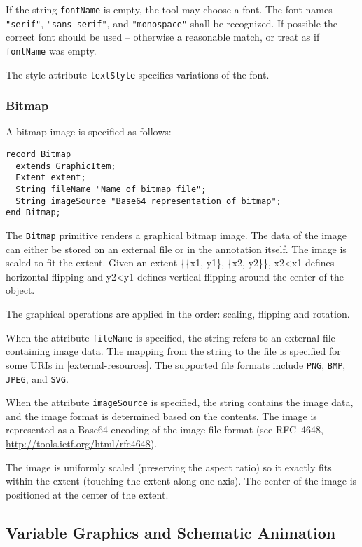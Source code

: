 If the string \lstinline!fontName! is empty, the tool may choose a font.  The font names \lstinline!"serif"!, \lstinline!"sans-serif"!, and \lstinline!"monospace"! shall be recognized.  If possible
the correct font should be used -- otherwise a reasonable match, or treat as if \lstinline!fontName! was empty.

The style attribute \lstinline!textStyle! specifies variations of the font.

\subsubsection{Bitmap}\label{bitmap}

A bitmap image is specified as follows:
\begin{lstlisting}[language=modelica]
record Bitmap
  extends GraphicItem;
  Extent extent;
  String fileName "Name of bitmap file";
  String imageSource "Base64 representation of bitmap";
end Bitmap;
\end{lstlisting}
The \lstinline!Bitmap! primitive renders a graphical bitmap image. The data of the
image can either be stored on an external file or in the annotation
itself. The image is scaled to fit the extent. Given an extent \{\{x1,
y1\}, \{x2, y2\}\}, x2\textless{}x1 defines horizontal flipping and
y2\textless{}y1 defines vertical flipping around the center of the
object.

The graphical operations are applied in the order: scaling, flipping and
rotation.

When the attribute \lstinline!fileName! is specified, the string refers to an
external file containing image data. The mapping from the string to the
file is specified for some URIs in \cref{external-resources}. The supported file
formats include \lstinline!PNG!, \lstinline!BMP!, \lstinline!JPEG!,
and \lstinline!SVG!.

When the attribute \lstinline!imageSource! is specified, the string contains the
image data, and the image format is determined based on the contents.
The image is represented as a Base64 encoding of the image file format
(see RFC~4648, \url{http://tools.ietf.org/html/rfc4648}).

The image is uniformly scaled (preserving the aspect ratio) so it exactly fits within the extent (touching the
extent along one axis).  The center of the image is positioned at the center of the extent.

\subsection{Variable Graphics and Schematic Animation}\label{variable-graphics-and-schematic-animation}

